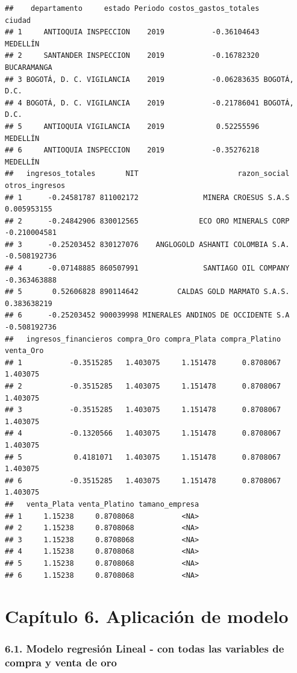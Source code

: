 \documentclass[
  11pt,
  a4paper,
]{book}
\begin{document}
\begin{verbatim}
##    departamento     estado Periodo costos_gastos_totales       ciudad
## 1     ANTIOQUIA INSPECCION    2019           -0.36104643     MEDELLÍN
## 2     SANTANDER INSPECCION    2019           -0.16782320  BUCARAMANGA
## 3 BOGOTÁ, D. C. VIGILANCIA    2019           -0.06283635 BOGOTÁ, D.C.
## 4 BOGOTÁ, D. C. VIGILANCIA    2019           -0.21786041 BOGOTÁ, D.C.
## 5     ANTIOQUIA VIGILANCIA    2019            0.52255596     MEDELLÍN
## 6     ANTIOQUIA INSPECCION    2019           -0.35276218     MEDELLÍN
##   ingresos_totales       NIT                       razon_social otros_ingresos
## 1      -0.24581787 811002172               MINERA CROESUS S.A.S    0.005953155
## 2      -0.24842906 830012565              ECO ORO MINERALS CORP   -0.210004581
## 3      -0.25203452 830127076    ANGLOGOLD ASHANTI COLOMBIA S.A.   -0.508192736
## 4      -0.07148885 860507991               SANTIAGO OIL COMPANY   -0.363463888
## 5       0.52606828 890114642         CALDAS GOLD MARMATO S.A.S.    0.383638219
## 6      -0.25203452 900039998 MINERALES ANDINOS DE OCCIDENTE S.A   -0.508192736
##   ingresos_financieros compra_Oro compra_Plata compra_Platino venta_Oro
## 1           -0.3515285   1.403075     1.151478      0.8708067  1.403075
## 2           -0.3515285   1.403075     1.151478      0.8708067  1.403075
## 3           -0.3515285   1.403075     1.151478      0.8708067  1.403075
## 4           -0.1320566   1.403075     1.151478      0.8708067  1.403075
## 5            0.4181071   1.403075     1.151478      0.8708067  1.403075
## 6           -0.3515285   1.403075     1.151478      0.8708067  1.403075
##   venta_Plata venta_Platino tamano_empresa
## 1     1.15238     0.8708068           <NA>
## 2     1.15238     0.8708068           <NA>
## 3     1.15238     0.8708068           <NA>
## 4     1.15238     0.8708068           <NA>
## 5     1.15238     0.8708068           <NA>
## 6     1.15238     0.8708068           <NA>
\end{verbatim}

\hypertarget{capuxedtulo-6.-aplicaciuxf3n-de-modelo}{%
\chapter{Capítulo 6. Aplicación de
modelo}\label{capuxedtulo-6.-aplicaciuxf3n-de-modelo}}

\hypertarget{modelo-regresiuxf3n-lineal---con-todas-las-variables-de-compra-y-venta-de-oro}{%
\subsection{6.1. Modelo regresión Lineal - con todas las variables de
compra y venta de
oro}\label{modelo-regresiuxf3n-lineal---con-todas-las-variables-de-compra-y-venta-de-oro}}
\end{document}
